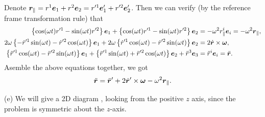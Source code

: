 \documentclass{article}
\begin{document}
\begin{solution}
Denote $ \boldsymbol{r}_{\parallel} = r^1\boldsymbol{e}_1+r^2\boldsymbol{e}_2 = r'^1\boldsymbol{e}_1'+r'^2\boldsymbol{e}_2' $. Then we can verify (by the reference frame transformation rule) that
\begin{align*}
\left\{\cos(\omega t)r'^1-\sin(\omega t)r'^2\right\}\boldsymbol{e}_1
+\left\{\cos(\omega t)r'^1-\sin(\omega t)r'^2\right\}\boldsymbol{e}_2
&=-\omega^2 r_{\parallel}^i \boldsymbol{e}_i=-\omega^2\boldsymbol{r}_{\parallel}, \\
2\omega\left\{-\dot{r}'^1\sin(\omega t)-\dot{r}'^2\cos(\omega t)\right\}\boldsymbol{e}_1
+2\omega\left\{\dot{r}'^1\cos(\omega t)-\dot{r}'^2\sin(\omega t)\right\}\boldsymbol{e}_2
&=2\dot{\boldsymbol{r}}\times\boldsymbol{\omega}, \\
\left\{\ddot{r}'^1\cos(\omega t)-\ddot{r}'^2\sin(\omega t)\right\}\boldsymbol{e}_1
+\left\{\ddot{r}'^1\sin(\omega t)+\ddot{r}'^2\cos(\omega t)\right\}\boldsymbol{e}_2
+\ddot{r}^3\boldsymbol{e}_3
&=\ddot{r}^i\boldsymbol{e}_i=\ddot{\boldsymbol{r}}.
\end{align*}
Asemble the above equations together, we got
\[ \ddot{\boldsymbol{r}} = \ddot{\boldsymbol{r}}' + 2\dot{\boldsymbol{r}}'\times \boldsymbol{\omega} -\omega^2\boldsymbol{r}_{\parallel}. \]

(e) We will give a 2D diagram , looking from the positive $ z $ axis, since the problem is symmetric about the \(z\)-axis. 


\end{solution}
\end{document}
